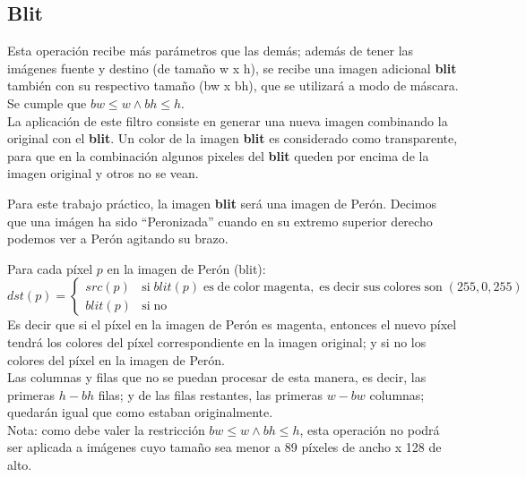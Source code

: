 \subsection{Blit}

Esta operaci\'on recibe m\'as par\'ametros que las dem\'as; adem\'as de tener las im\'agenes fuente y destino (de tama\~no w x h), 
se recibe una imagen adicional \textbf{blit} tambi\'en con su respectivo tama\~no (bw x bh), que se utilizar\'a a modo de m\'ascara.
Se cumple que $bw \leq w \wedge bh \leq h$.\\

La aplicaci\'on de este filtro consiste en generar una nueva imagen combinando la original con el \textbf{blit}.
Un color de la imagen \textbf{blit} es considerado como transparente,
para que en la combinaci\'on algunos pixeles del \textbf{blit} queden por encima de la imagen original y otros no se vean.

Para este trabajo pr\'actico, la imagen \textbf{blit} ser\'a una imagen de Per\'on.
Decimos que una im\'agen ha sido ``Peronizada'' cuando en su extremo superior derecho podemos ver a Per\'on agitando su brazo.

\vskip 8pt
Para cada p\'ixel $p$ en la imagen de Per\'on (blit):\\
$dst(p) = \begin{cases}
    src(p) & \mathrm{si \;} blit(p) \mathrm{\; es \; de \; color \; magenta, \; es \; decir \; sus \; colores \; son \;} (255, 0, 255)\\
    blit(p) & \mathrm{si \; no}
\end{cases}$ \\

Es decir que si el p\'ixel en la imagen de Per\'on es magenta, entonces el nuevo p\'ixel tendr\'a los colores del p\'ixel correspondiente 
en la imagen original; y si no los colores del p\'ixel en la imagen de Per\'on. \\

Las columnas y filas que no se puedan procesar de esta manera, es decir, 
las primeras $h - bh$ filas; y de las filas restantes, las primeras $w - bw$ columnas; 
quedar\'an igual que como estaban originalmente. \\

Nota: como debe valer la restricci\'on $bw \leq w \wedge bh \leq h$, esta operaci\'on 
no podr\'a ser aplicada a im\'agenes cuyo tama\~no sea menor a 89 p\'ixeles de ancho 
x 128 de alto.

